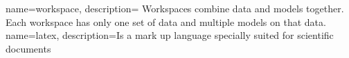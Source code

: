 {
    name={workspace},
    description={%
        Workspaces combine data and models together. Each workspace has only one set of data and multiple models on that data.
    }
}
{
    name={latex},
    description={Is a mark up language specially suited for scientific documents}
}